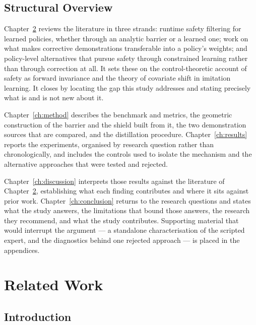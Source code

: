 \documentclass[a4paper,11pt]{report}
\begin{document}
\section{Structural Overview}

Chapter~\ref{ch:background} reviews the literature in three strands: runtime safety filtering for
learned policies, whether through an analytic barrier or a learned one; work on what makes
corrective demonstrations transferable into a policy's weights; and policy-level alternatives that
pursue safety through constrained learning rather than through correction at all. It sets these on
the control-theoretic account of safety as forward invariance and the theory of covariate shift in
imitation learning. It closes by locating the gap this study
addresses and stating precisely what is and is not new about it.

Chapter~\ref{ch:method} describes the benchmark and metrics, the geometric construction of the
barrier and the shield built from it, the two demonstration sources that are compared, and the
distillation procedure. Chapter~\ref{ch:results} reports the experiments, organised by research
question rather than chronologically, and includes the controls used to isolate the mechanism and
the alternative approaches that were tested and rejected.

Chapter~\ref{ch:discussion} interprets those results against the literature of
Chapter~\ref{ch:background}, establishing what each finding contributes and where it sits against
prior work. Chapter~\ref{ch:conclusion} returns to the research questions and states what the study
answers, the limitations that bound those answers, the research they recommend, and what the study
contributes. Supporting material that would interrupt
the argument --- a standalone characterisation of the scripted expert, and the diagnostics behind
one rejected approach --- is placed in the appendices.





\chapter{Related Work}\label{ch:background}

\section{Introduction}\label{sec:bg:intro}
\end{document}
